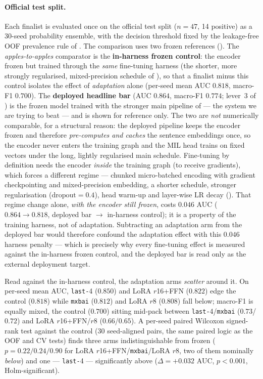 \paragraph{Official test split.} Each finalist is evaluated once on the official
test split ($n\!=\!47$, 14 positive) as a 30-seed probability ensemble, with the
decision threshold fixed by the leakage-free OOF prevalence rule of
. The comparison uses two frozen references
(). The \emph{apples-to-apples} comparator is the
\textbf{in-harness frozen control}: the encoder frozen but trained through the
\emph{same} fine-tuning harness (the shorter, more strongly regularised,
mixed-precision schedule of ), so that a finalist minus
this control isolates the effect of \emph{adaptation} alone (per-seed mean AUC
$0.818$, macro-F1 $0.700$). The \textbf{deployed headline bar} (AUC $0.864$, macro-F1 $0.774$;
lever~3 of ) is the frozen model trained with the stronger main
pipeline of  --- the system we are trying to beat --- and is
shown for reference only. The two are \emph{not} numerically comparable, for a
structural reason: the deployed pipeline keeps the encoder frozen and therefore
\emph{pre-computes and caches} the sentence embeddings once, so the encoder never
enters the training graph and the MIL head trains on fixed vectors under the long,
lightly regularised main schedule. Fine-tuning by definition needs the encoder
\emph{inside} the training graph (to receive gradients), which forces a different
regime --- chunked micro-batched encoding with gradient checkpointing and
mixed-precision embedding, a shorter schedule, stronger regularisation
($\text{dropout}=0.4$), head warm-up and layer-wise LR decay ().
That regime change alone, \emph{with the encoder still frozen}, costs $0.046$ AUC
($0.864\!\to\!0.818$, deployed bar $\to$ in-harness control); it is a property of
the training harness, not of adaptation. Subtracting an adaptation arm from the
deployed bar would therefore confound the adaptation effect with this $0.046$
harness penalty --- which is precisely why every fine-tuning effect is measured
against the in-harness frozen control, and the deployed bar is read only as the
external deployment target.

Read against the in-harness control, the adaptation arms \emph{scatter} around it.
On per-seed mean AUC, \texttt{last-}4 ($0.850$) and LoRA $r$16+FFN ($0.822$) edge
the control ($0.818$) while \texttt{mxbai} ($0.812$) and LoRA $r$8 ($0.808$) fall
below; macro-F1 is equally mixed, the control ($0.700$) sitting mid-pack between
\texttt{last-}4/\texttt{mxbai} ($0.73$/$0.72$) and LoRA $r$16+FFN/$r$8
($0.66$/$0.65$). A per-seed paired Wilcoxon signed-rank test against the control
(30 seed-aligned pairs, the same paired logic as the OOF and CV tests) finds three
arms indistinguishable from frozen ($p=0.22/0.24/0.90$ for LoRA
$r$16+FFN/\texttt{mxbai}/LoRA $r$8, two of them nominally \emph{below}) and one ---
\texttt{last-}4 --- significantly above ($\Delta=+0.032$ AUC, $p<0.001$,
Holm-significant).

